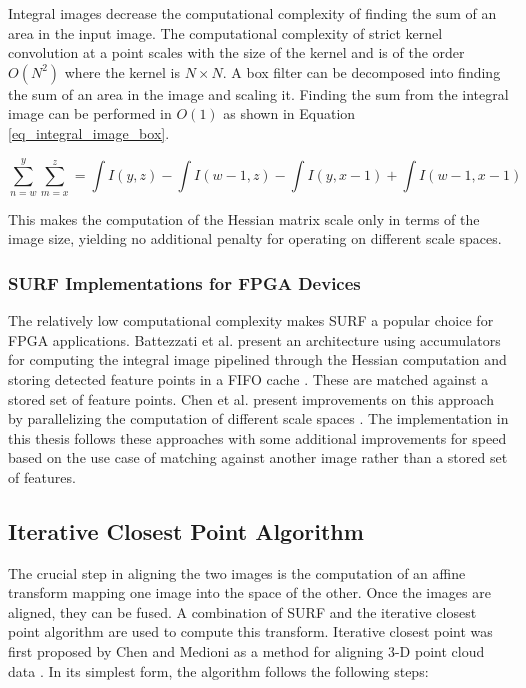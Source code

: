 \documentclass{article}
\begin{document}
Integral images decrease the computational complexity of finding the sum of an area in the input image. The computational complexity of strict kernel convolution at a point scales with the size of the kernel and is of the order $O(N^2)$ where the kernel is $N \times N$. A box filter can be decomposed into finding the sum of an area in the image and scaling it. Finding the sum from the integral image can be performed in $O(1)$ as shown in Equation \ref{eq_integral_image_box}. 

\begin{equation}
\sum\limits_{n=w}^y \sum\limits_{m=x}^z = \int I(y,z) - \int I(w-1,z) - \int I(y,x-1) + \int I(w-1, x-1)
\label{eq_integral_image_box}
\end{equation}

This makes the computation of the Hessian matrix scale only in terms of the image size, yielding no additional penalty for operating on different scale spaces.

\subsubsection{SURF Implementations for FPGA Devices}

The relatively low computational complexity makes SURF a popular choice for FPGA applications. Battezzati et al. present an architecture using accumulators for computing the integral image pipelined through the Hessian computation and storing detected feature points in a FIFO cache \cite{battezzati_surf_2012}. These are matched against a stored set of feature points. Chen et al. present improvements on this approach by parallelizing the computation of different scale spaces \cite{chen_fpga-based_2016}. The implementation in this thesis follows these approaches with some additional improvements for speed based on the use case of matching against another image rather than a stored set of features.

\subsection{Iterative Closest Point Algorithm}

The crucial step in aligning the two images is the computation of an affine transform mapping one image into the space of the other. Once the images are aligned, they can be fused. A combination of SURF and the iterative closest point algorithm are used to compute this transform. Iterative closest point was first proposed by Chen and Medioni as a method for aligning 3-D point cloud data \cite{chen_object_1992}. In its simplest form, the algorithm follows the following steps:
\end{document}
